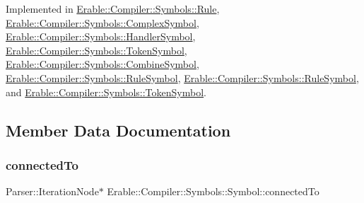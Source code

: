 Implemented in \mbox{\hyperlink{class_erable_1_1_compiler_1_1_symbols_1_1_rule_a8bb5224d85a4867c71b6c1bc7ec901c0}{Erable\+::\+Compiler\+::\+Symbols\+::\+Rule}}, \mbox{\hyperlink{class_erable_1_1_compiler_1_1_symbols_1_1_complex_symbol_a90d749e601a727d6d42ddb195e65ea37}{Erable\+::\+Compiler\+::\+Symbols\+::\+Complex\+Symbol}}, \mbox{\hyperlink{class_erable_1_1_compiler_1_1_symbols_1_1_handler_symbol_ae0846995b3c622180725b160a1e17f8a}{Erable\+::\+Compiler\+::\+Symbols\+::\+Handler\+Symbol}}, \mbox{\hyperlink{class_erable_1_1_compiler_1_1_symbols_1_1_token_symbol_a0f8499152ff070ae70295c9b25b25b93}{Erable\+::\+Compiler\+::\+Symbols\+::\+Token\+Symbol}}, \mbox{\hyperlink{struct_erable_1_1_compiler_1_1_symbols_1_1_combine_symbol_aedd44bc23607d42bdb45a35aba3dd184}{Erable\+::\+Compiler\+::\+Symbols\+::\+Combine\+Symbol}}, \mbox{\hyperlink{class_erable_1_1_compiler_1_1_symbols_1_1_rule_symbol_a4fc1d4bfd6e2587308dc274fa0934511}{Erable\+::\+Compiler\+::\+Symbols\+::\+Rule\+Symbol}}, \mbox{\hyperlink{class_erable_1_1_compiler_1_1_symbols_1_1_rule_symbol_a4fc1d4bfd6e2587308dc274fa0934511}{Erable\+::\+Compiler\+::\+Symbols\+::\+Rule\+Symbol}}, and \mbox{\hyperlink{class_erable_1_1_compiler_1_1_symbols_1_1_token_symbol_a0f8499152ff070ae70295c9b25b25b93}{Erable\+::\+Compiler\+::\+Symbols\+::\+Token\+Symbol}}.



\subsection{Member Data Documentation}
\mbox{\label{class_erable_1_1_compiler_1_1_symbols_1_1_symbol_a8fcbecdc112fd91cfec407895a0783ae}} 
\subsubsection{\texorpdfstring{connectedTo}{connectedTo}}
{\footnotesize\ttfamily Parser\+::\+Iteration\+Node$\ast$ Erable\+::\+Compiler\+::\+Symbols\+::\+Symbol\+::connected\+To}

\mbox{\label{class_erable_1_1_compiler_1_1_symbols_1_1_symbol_abf7b881e0a9da479710cdb29133a8936}} 
